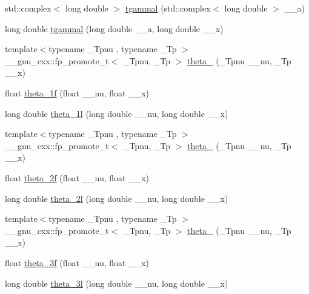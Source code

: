 \begin{DoxyCompactItemize}
\item 
std\+::complex$<$ long double $>$ \hyperlink{group__mathsf__gnu_ga8d53515dba9c860fd6058a4b75aaff58}{tgammal} (std\+::complex$<$ long double $>$ \+\_\+\+\_\+a)
\item 
long double \hyperlink{group__mathsf__gnu_gabebff9ffba6acf55f3a3cd716ef5007a}{tgammal} (long double \+\_\+\+\_\+a, long double \+\_\+\+\_\+x)
\item 
{\footnotesize template$<$typename \+\_\+\+Tpnu , typename \+\_\+\+Tp $>$ }\\\+\_\+\+\_\+gnu\+\_\+cxx\+::fp\+\_\+promote\+\_\+t$<$ \+\_\+\+Tpnu, \+\_\+\+Tp $>$ \hyperlink{group__mathsf__gnu_gaa2e5a3a5f550fe032a596a8b01c878c0}{theta\+\_} (\+\_\+\+Tpnu \+\_\+\+\_\+nu, \+\_\+\+Tp \+\_\+\+\_\+x)
\item 
float \hyperlink{group__mathsf__gnu_ga5bbf256b875da28132f9049f5984cb14}{theta\+\_\+1f} (float \+\_\+\+\_\+nu, float \+\_\+\+\_\+x)
\item 
long double \hyperlink{group__mathsf__gnu_ga3520684c78771ffa57180060c8b6d1ca}{theta\+\_\+1l} (long double \+\_\+\+\_\+nu, long double \+\_\+\+\_\+x)
\item 
{\footnotesize template$<$typename \+\_\+\+Tpnu , typename \+\_\+\+Tp $>$ }\\\+\_\+\+\_\+gnu\+\_\+cxx\+::fp\+\_\+promote\+\_\+t$<$ \+\_\+\+Tpnu, \+\_\+\+Tp $>$ \hyperlink{group__mathsf__gnu_ga16f278edeb2842d614bae1f1ae2d0256}{theta\+\_} (\+\_\+\+Tpnu \+\_\+\+\_\+nu, \+\_\+\+Tp \+\_\+\+\_\+x)
\item 
float \hyperlink{group__mathsf__gnu_ga78e832796aedf5159b142801e1184392}{theta\+\_\+2f} (float \+\_\+\+\_\+nu, float \+\_\+\+\_\+x)
\item 
long double \hyperlink{group__mathsf__gnu_gac5a30c772d4888442665945e7f3fa017}{theta\+\_\+2l} (long double \+\_\+\+\_\+nu, long double \+\_\+\+\_\+x)
\item 
{\footnotesize template$<$typename \+\_\+\+Tpnu , typename \+\_\+\+Tp $>$ }\\\+\_\+\+\_\+gnu\+\_\+cxx\+::fp\+\_\+promote\+\_\+t$<$ \+\_\+\+Tpnu, \+\_\+\+Tp $>$ \hyperlink{group__mathsf__gnu_ga146c3b8e86991e164d4bf143cda5f0fc}{theta\+\_} (\+\_\+\+Tpnu \+\_\+\+\_\+nu, \+\_\+\+Tp \+\_\+\+\_\+x)
\item 
float \hyperlink{group__mathsf__gnu_ga9a7c967d2a456f1a6aceee9a53f024b1}{theta\+\_\+3f} (float \+\_\+\+\_\+nu, float \+\_\+\+\_\+x)
\item 
long double \hyperlink{group__mathsf__gnu_gaf88874ff6c69940d2191f7947d2ea119}{theta\+\_\+3l} (long double \+\_\+\+\_\+nu, long double \+\_\+\+\_\+x)

\end{DoxyCompactItemize}

